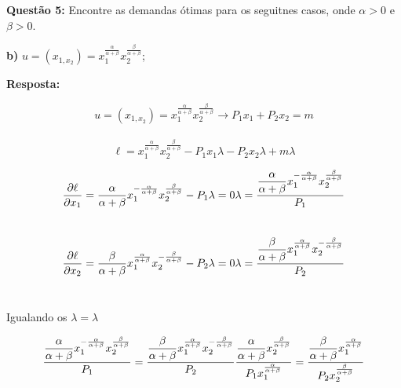 \begin{flushleft}
		\textbf{Questão 5:} Encontre as demandas ótimas para os seguitnes casos, onde $\alpha > 0$ e $\beta >0$.
		\singlespacing

		\textbf{b)} $u=(x_{1, x_{2}}) = x_{1}^{\frac{\alpha}{\alpha + \beta}} x_{2}^{\frac{\beta}{\alpha + \beta}}$;
		
		\singlespacing



		\textbf{Resposta:} 
		\singlespacing

		$$u=(x_{1, x_{2}}) = x_{1}^{\frac{\alpha}{\alpha + \beta}} x_{2}^{\frac{\beta}{\alpha + \beta}} \rightarrow P_{1}x_{1}+P_{2}x_{2} = m$$
		\\
		$$\ell= x_{1}^{\frac{\alpha}{\alpha + \beta}} x_{2}^{\frac{\beta}{\alpha + \beta}} - P_{1}x_{1}\lambda -P_{2}x_{2}\lambda  + m\lambda $$

		\begin{equation}
			\frac{\partial\ell}{\partial x_{1}} = \dfrac{\alpha}{\alpha + \beta}x_{1}^{-\frac{\alpha}{\alpha + \beta}} x_{2}^{\frac{\beta}{\alpha + \beta}} - P_{1}\lambda = 0 $$\\$$
			\lambda = \dfrac{\dfrac{\alpha}{\alpha + \beta}x_{1}^{-\frac{\alpha}{\alpha + \beta}} x_{2}^{\frac{\beta}{\alpha + \beta}}}{P_{1}}
		\end{equation}
\\
		\begin{equation}
		\frac{\partial\ell}{\partial x_{2}} = \dfrac{\beta}{\alpha + \beta}x_{1}^{\frac{\alpha}{\alpha + \beta}} x_{2}^{-\frac{\beta}{\alpha + \beta}} - P_{2}\lambda = 0 
		$$\\$$
		\lambda = \dfrac{\dfrac{\beta}{\alpha + \beta}x_{1}^{\frac{\alpha}{\alpha + \beta}} x_{2}^{-\frac{\beta}{\alpha + \beta}}}{P_{2}}
		\end{equation}
\\
\begin{center}
	Igualando os $\lambda = \lambda$ \\
\end{center}
		\begin{equation}
		\dfrac{\dfrac{\alpha}{\alpha + \beta}x_{1}^{-\frac{\alpha}{\alpha + \beta}} x_{2}^{\frac{\beta}{\alpha + \beta}}}{P_{1}} = \dfrac{\dfrac{\beta}{\alpha + \beta}x_{1}^{\frac{\alpha}{\alpha + \beta}} x_{2}^{-\frac{\beta}{\alpha + \beta}}}{P_{2}} 
		$$\\$$
		\dfrac{\dfrac{\alpha}{\alpha + \beta} x_{2}^{\frac{\beta}{\alpha + \beta}}}{P_{1}x_{1}^{\frac{\alpha}{\alpha + \beta}}} = \dfrac{\dfrac{\beta}{\alpha + \beta} x_{1}^{\frac{\alpha}{\alpha + \beta}}}{P_{2}x_{2}^{\frac{\beta}{\alpha + \beta}}}
		\end{equation}
\\


\end{flushleft}
